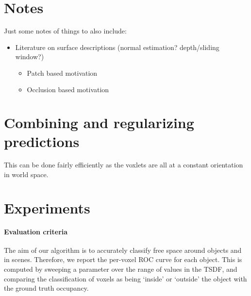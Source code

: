 \documentclass[10pt,twocolumn,letterpaper]{article}
\begin{document}





\section{Notes}
Just some notes of things to also include:

\begin{itemize}
\item Literature on surface descriptions (normal estimation? depth/sliding window?)
\begin{itemize}
\item Patch based motivation
\item Occlusion based motivation
\end{itemize}
\end{itemize}



\section{Combining and regularizing predictions}

This can be done fairly efficiently as the voxlets are all at a constant orientation in world space.


\section{Experiments}

\paragraph{Evaluation criteria}
The aim of our algorithm is to accurately classify free space around objects and in scenes.
Therefore, we report the per-voxel ROC curve for each object.
This is computed by sweeping a parameter over the range of values in the TSDF, and comparing the classification of voxels as being `inside' or `outside' the object with the ground truth occupancy.
\end{document}
